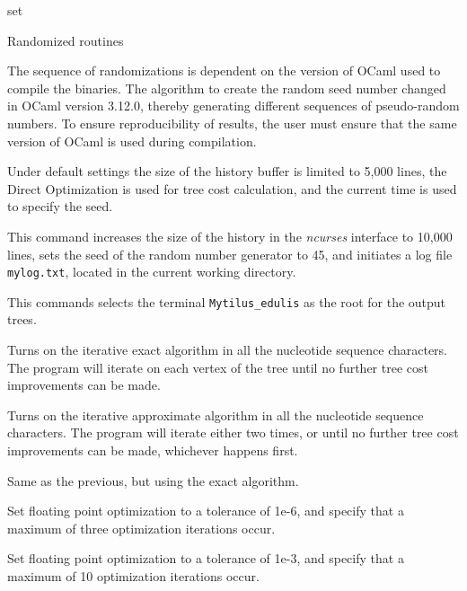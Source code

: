 \begin{command}{set}{}
\begin{arguments}
\begin{argumentgroup}{Randomized routines}
\begin{statement}
The sequence of randomizations is dependent on the version of
OCaml used to compile the binaries. The algorithm to create the
random seed number changed in OCaml version 3.12.0, thereby
generating different sequences of pseudo-random numbers. To
ensure reproducibility of results, the user must ensure that the
same version of OCaml is used during compilation.
\end{statement}

\end{argumentgroup}
\end{arguments}

{Under default settings the size of the history buffer is limited to
5,000 lines, the Direct Optimization is used for tree cost calculation,
and the current time is used to specify the seed.}

\begin{poyexamples}
{This command increases the size of the history in the \emph{ncurses}
interface to 10,000 lines, sets the seed of the random number generator to 45,
and initiates a log file \texttt{mylog.txt}, located in the current
working directory.}

{This commands selects the terminal \texttt{Mytilus\_edulis} as the root
for the output trees.}

{Turns on the iterative exact algorithm in all the nucleotide
sequence characters. The program will iterate on each vertex of the
tree until no further tree cost improvements can be made.}

{Turns on the iterative approximate algorithm in all the nucleotide
sequence characters. The program will iterate either two times, or
until no further tree cost improvements can be made, whichever
happens first.}

{Same as the previous, but using the exact algorithm.}

{Set floating point optimization to a tolerance of 1e-6, and specify that
a maximum of three optimization iterations occur.}

{Set floating point optimization to a tolerance of 1e-3, and specify that
a maximum of 10 optimization iterations occur.}

\end{poyexamples}

\begin{poyalso}
\end{poyalso}

\end{command}

